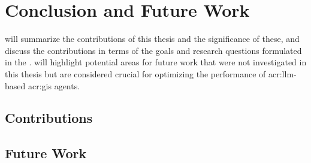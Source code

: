 \chapter{Conclusion and Future Work}
\label{cha:conclusion}

 will summarize the contributions of this thesis and the significance of these, and discuss the contributions in terms of the goals and research questions formulated in the .  will highlight potential areas for future work that were not investigated in this thesis but are considered crucial for optimizing the performance of \acrshort{acr:llm}-based \acrshort{acr:gis} agents.

\section{Contributions}
\label{sec:contributions}

\begin{comment}
What are the main contributions made to the field?
How significant are these contributions?
Also discuss the contributions in terms of the goals and research questions formulated in the Introduction.

The contributions section will normally contain everything that you address in the abstract, but in an extended form and quite possibly additional issues that cannot be included in the abstract.
An obvious difference is that when the reader has come this far in the text, she/he should be quite familiar with the work, but while reading the abstract they will have little to no knowledge of the work.

The section ``Contributions'' in Chapter~\ref{cha:introduction} differs from this one in that the former is just a list of the main bits, while this section should explain them in more detail.
However, basically the same items should appear in both sections.
\end{comment}



\section{Future Work}
\label{sec:future-work}

\begin{comment}
Consider where you would like to extend or improve this work, or how somebody else could continue it.
These extensions might either be continuing the ongoing direction or taking a side direction that became obvious during the work.
Further, possible solutions to limitations in the work conducted, highlighted in Section~\ref{sec:discussion} may be presented.

Note that in the Specialisation Project Report, the Future Work section will be a key part of your plan for the novel work to be carried out in the next semester,
while in the Master's Thesis, the Future Work section rather will point to issues that others might be interested in addressing.
This can include options and alternatives that you did not try out yourself, or potential improvements and extensions to your experiments or system.
\end{comment}

